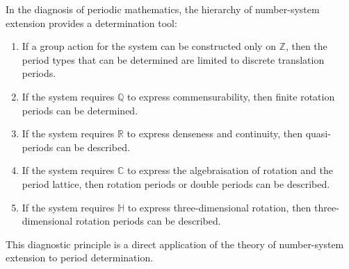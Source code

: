\begin{corollary}\label{cor:number_system_diagnosis}
In the diagnosis of periodic mathematics, the hierarchy of number-system extension provides a determination tool:
\begin{enumerate}[label=(\roman*)]
    \item If a group action for the system can be constructed only on $\mathbb{Z}$, then the period types that can be determined are limited to discrete translation periods.
    \item If the system requires $\mathbb{Q}$ to express commensurability, then finite rotation periods can be determined.
    \item If the system requires $\mathbb{R}$ to express denseness and continuity, then quasi-periods can be described.
    \item If the system requires $\mathbb{C}$ to express the algebraisation of rotation and the period lattice, then rotation periods or double periods can be described.
    \item If the system requires $\mathbb{H}$ to express three-dimensional rotation, then three-dimensional rotation periods can be described.
\end{enumerate}
This diagnostic principle is a direct application of the theory of number-system extension to period determination.
\end{corollary}

